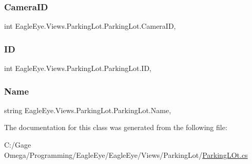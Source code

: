 \subsubsection{\texorpdfstring{CameraID}{CameraID}}
{\footnotesize\ttfamily int Eagle\+Eye.\+Views.\+Parking\+Lot.\+Parking\+Lot.\+Camera\+ID\hspace{0.3cm}{\ttfamily [get]}, {\ttfamily [set]}}

\mbox{\label{class_eagle_eye_1_1_views_1_1_parking_lot_1_1_parking_lot_a577b278535b3599ca2aeb7ad17232f76}} 
\subsubsection{\texorpdfstring{ID}{ID}}
{\footnotesize\ttfamily int Eagle\+Eye.\+Views.\+Parking\+Lot.\+Parking\+Lot.\+ID\hspace{0.3cm}{\ttfamily [get]}, {\ttfamily [set]}}

\mbox{\label{class_eagle_eye_1_1_views_1_1_parking_lot_1_1_parking_lot_afad744515e8684f99befb40034fda405}} 
\subsubsection{\texorpdfstring{Name}{Name}}
{\footnotesize\ttfamily string Eagle\+Eye.\+Views.\+Parking\+Lot.\+Parking\+Lot.\+Name\hspace{0.3cm}{\ttfamily [get]}, {\ttfamily [set]}}



The documentation for this class was generated from the following file\+:\begin{DoxyCompactItemize}
\item 
C\+:/\+Gage Omega/\+Programming/\+Eagle\+Eye/\+Eagle\+Eye/\+Views/\+Parking\+Lot/\mbox{\hyperlink{_views_2_parking_lot_2_parking_lot_8cs}{Parking\+L\+Ot.\+cs}}\end{DoxyCompactItemize}
